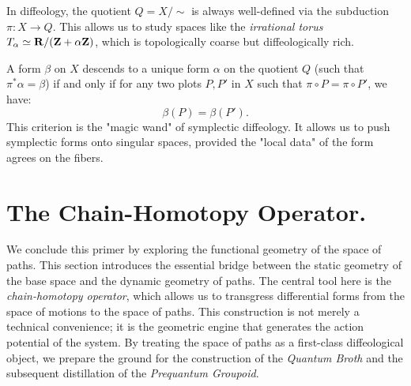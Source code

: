   \begin{article}
    In diffeology,
    the quotient $Q = X/\!\!\sim$ is always well-defined via the subduction $\pi: X \to Q$.
    This allows us to study spaces like the \emph{irrational torus} $T_\alpha \simeq {\mathbf{R}} / ({\mathbf{Z}} + \alpha{\mathbf{Z}})$,
    which is topologically coarse but diffeologically rich.
    
    A form $\beta$ on $X$ descends to a unique form $\alpha$ on the quotient $Q$
    (such that $\pi^*\alpha = \beta$)
    if and only if for any two plots $P, P'$ in $X$ such that $\pi \circ P = \pi \circ P'$,
    we have:
    \[
      \beta(P) = \beta(P').
      \]
    This criterion is the "magic wand" of symplectic diffeology.
    It allows us to push symplectic forms onto singular spaces,
    provided the "local data" of the form agrees on the fibers.
  \end{article}
  
  \section{The Chain-Homotopy Operator.}
  \label{sec:The Chain-Homotopy Operator}
  
  We conclude this primer by exploring the functional geometry of the space of paths.
  This section introduces the essential bridge between the static geometry of the base space and the dynamic geometry of paths.
  The central tool here is the \emph{chain-homotopy operator},
  which allows us to transgress differential forms from the space of motions to the space of paths.
  This construction is not merely a technical convenience;
  it is the geometric engine that generates the action potential of the system.
  By treating the space of paths as a first-class diffeological object,
  we prepare the ground for the construction of the \emph{Quantum Broth} and the subsequent distillation of the \emph{Prequantum Groupoid}.
  
